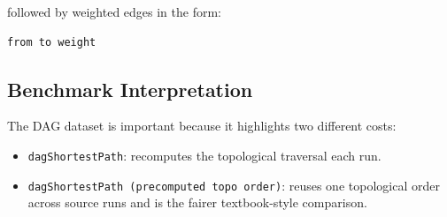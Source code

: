 followed by weighted edges in the form:
\begin{verbatim}
from to weight
\end{verbatim}

\subsection{Benchmark Interpretation}
The DAG dataset is important because it highlights two different costs:
\begin{itemize}
	\item \texttt{dagShortestPath}: recomputes the topological traversal each run.
	\item \texttt{dagShortestPath (precomputed topo order)}: reuses one topological order across source runs and is the fairer textbook-style comparison.
\end{itemize}